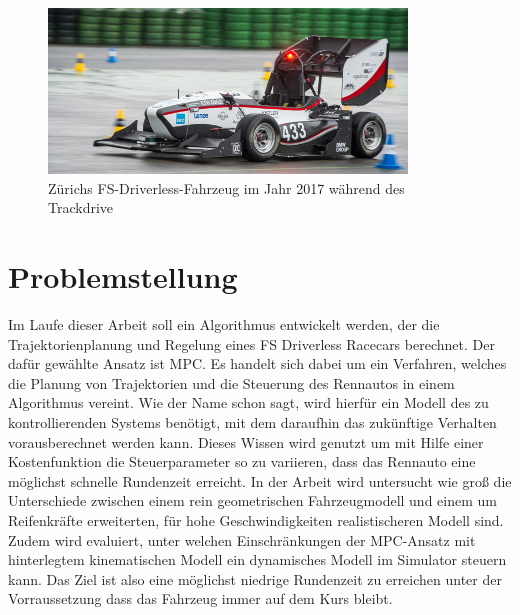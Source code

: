 \documentclass{like}
\begin{document}
\begin{figure}[hb!]
	\centering
	\includegraphics[width=270pt]{Abbildungen/amz-driverless-long.jpg}
	\caption{Zürichs \ac{FS}-Driverless-Fahrzeug im Jahr 2017 während des Trackdrive}
\end{figure}

\section{Problemstellung}
Im Laufe dieser Arbeit soll ein Algorithmus entwickelt werden, der die Trajektorienplanung und Regelung eines \ac{FS} Driverless Racecars berechnet. Der dafür gewählte Ansatz ist \acl{MPC}. Es handelt sich dabei um ein Verfahren, welches die Planung von Trajektorien und die Steuerung des Rennautos in einem Algorithmus vereint. Wie der Name schon sagt, wird hierfür ein Modell des zu kontrollierenden Systems benötigt, mit dem daraufhin das zukünftige Verhalten vorausberechnet werden kann. Dieses Wissen wird genutzt um mit Hilfe einer Kostenfunktion die Steuerparameter so zu variieren, dass das Rennauto eine möglichst schnelle Rundenzeit erreicht. In der Arbeit wird untersucht wie groß die Unterschiede zwischen einem rein geometrischen Fahrzeugmodell und einem um Reifenkräfte erweiterten, für hohe Geschwindigkeiten realistischeren Modell sind. Zudem wird evaluiert, unter welchen Einschränkungen der \ac{MPC}-Ansatz mit hinterlegtem kinematischen Modell ein dynamisches Modell im Simulator steuern kann. Das Ziel ist also eine möglichst niedrige Rundenzeit zu erreichen unter der Vorraussetzung dass das Fahrzeug immer auf dem Kurs bleibt.
\end{document}

